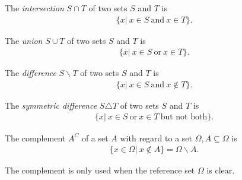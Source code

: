 

\begin{df}
The \emph{intersection} $S \cap T$ of two sets $S$ and $T$ is 
\begin{align*}
\{ x | ~ x \in S ~\text{and}~ x \in T \}.
\end{align*} 
\end{df}
\begin{df}
The \emph{union} $S \cup T$ of two sets $S$ and $T$ is 
\begin{align*}
\{ x | ~ x \in S ~\text{or}~ x \in T \}.
\end{align*} 
\end{df}
\begin{df}
The \emph{difference} $S \backslash T$ of two sets $S$ and $T$ is 
\begin{align*}
\{ x | ~ x \in S ~\text{and}~ x \not\in T \}.
\end{align*} 
\end{df}
\begin{df}
	The \emph{symmetric difference} $S \triangle T$ of two sets $S$ and $T$ is 
	\begin{align*}
	\{ x | ~ x \in S ~\text{or}~ x \in T ~\text{but not both} \}.
	\end{align*} 
\end{df}
	\begin{df}
		The complement $A^C$ of a set $A$ with regard to a set $\Omega, A \subseteq \Omega$ is
		\begin{align*}
		\{ x\in \Omega| ~x \notin A \}
		= \Omega \backslash A.
		\end{align*}
	\end{df}
	\begin{rk}
		The complement is only used when the reference set $\Omega$ is clear.
	\end{rk}
